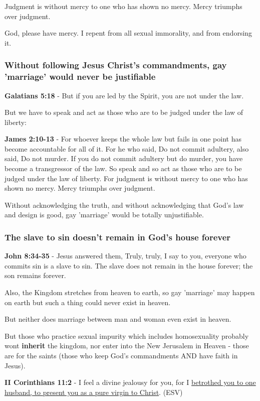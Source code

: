 \documentclass[11pt]{article}
\begin{document}
Judgment is without mercy to one who has shown no mercy. Mercy triumphs over judgment.

God, please have mercy. I repent from all sexual immorality, and from endorsing it.

\subsubsection{Without following Jesus Christ's commandments, gay 'marriage' would never be justifiable}
\label{sec:org7259832}
\textbf{Galatians 5:18} - But if you are led by the Spirit, you are not under the law.

But we have to speak and act as those who are to be judged under the law of liberty:

\textbf{James 2:10-13} - For whoever keeps the whole law but fails in one point has become accountable for all of it. For he who said, Do not commit adultery, also said, Do not murder. If you do not commit adultery but do murder, you have become a transgressor of the law. So speak and so act as those who are to be judged under the law of liberty. For judgment is without mercy to one who has shown no mercy. Mercy triumphs over judgment.

Without acknowledging the truth, and without acknowledging that God's law and design is good, gay 'marriage' would be totally unjustifiable.

\subsubsection{The slave to sin doesn't remain in God's house forever}
\label{sec:org66c8f88}
\textbf{John 8:34-35} - Jesus answered them, Truly, truly, I say to you, everyone who commits sin is a slave to sin. The slave does not remain in the house forever; the son remains forever.

Also, the Kingdom stretches from heaven to earth, so gay 'marriage' may happen on earth but such a thing could never exist in heaven.

But neither does marriage between man and woman even exist in heaven.

But those who practice sexual impurity which includes homosexuality probably wont \textbf{inherit} the kingdom,
nor enter into the New Jerusalem in Heaven - those are for the saints (those who keep God's commandments AND have faith in Jesus).

\textbf{II Corinthians 11:2} - I feel a divine jealousy for you, for I \uline{betrothed you to one husband, to present you as a pure virgin to Christ}. (ESV)
\end{document}
